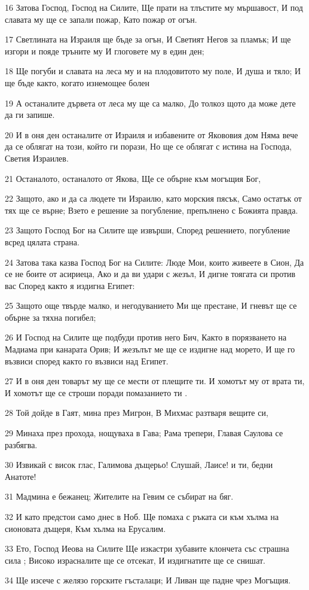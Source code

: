 \par 16 Затова Господ, Господ на Силите, Ще прати на тлъстите му мършавост, И под славата му ще се запали пожар, Като пожар от огън.
\par 17 Светлината на Израиля ще бъде за огън, И Светият Негов за пламък; И ще изгори и пояде тръните му И глоговете му в един ден;
\par 18 Ще погуби и славата на леса му и на плодовитото му поле, И душа и тяло; И ще бъде както, когато изнемощее болен
\par 19 А останалите дървета от леса му ще са малко, До толкоз щото да може дете да ги запише.
\par 20 И в оня ден останалите от Израиля и избавените от Якововия дом Няма вече да се облягат на този, който ги порази, Но ще се облягат с истина на Господа, Светия Израилев.
\par 21 Останалото, останалото от Якова, Ще се обърне към могъщия Бог,
\par 22 Защото, ако и да са людете ти Израилю, като морския пясък, Само остатък от тях ще се върне; Взето е решение за погубление, препълнено с Божията правда.
\par 23 Защото Господ Бог на Силите ще извърши, Според решението, погубление всред цялата страна.
\par 24 Затова така казва Господ Бог на Силите: Люде Мои, които живеете в Сион, Да се не боите от асириеца, Ако и да ви удари с жезъл, И дигне тоягата си против вас Според както я издигна Египет:
\par 25 Защото още твърде малко, и негодуванието Ми ще престане, И гневът ще се обърне за тяхна погибел;
\par 26 И Господ на Силите ще подбуди против него Бич, Както в порязването на Мадиама при канарата Орив; И жезълът ме ще се издигне над морето, И ще го възвиси според както го възвиси над Египет.
\par 27 И в оня ден товарът му ще се мести от плещите ти. И хомотът му от врата ти, И хомотът ще се строши поради помазанието ти .
\par 28 Той дойде в Гаят, мина през Мигрон, В Михмас разтваря вещите си,
\par 29 Минаха през прохода, нощуваха в Гава; Рама трепери, Главая Саулова се разбягва.
\par 30 Извикай с висок глас, Галимова дъщерьо! Слушай, Лаисе! и ти, бедни Анатоте!
\par 31 Мадмина е бежанец; Жителите на Гевим се събират на бяг.
\par 32 И като предстои само днес в Ноб. Ще помаха с ръката си към хълма на сионовата дъщеря, Към хълма на Ерусалим.
\par 33 Ето, Господ Иеова на Силите Ще изкастри хубавите клончета със страшна сила ; Високо израсналите ще се отсекат, И издигнатите ще се снишат.
\par 34 Ще изсече с желязо горските гъсталаци; И Ливан ще падне чрез Могъщия.

